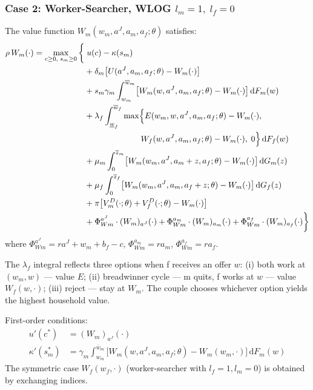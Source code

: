 \documentclass[11pt]{article}
\newcommand{\aJ}{a^{J}}
\newcommand{\dF}{\,\mathrm{d}F}
\newcommand{\dG}{\,\mathrm{d}G}
\begin{document}
\subsubsection{Case 2: Worker-Searcher, WLOG $l_m = 1,\; l_f = 0$}

The value function $W_m(w_m, \aJ, a_m, a_f;\theta)$ satisfies:
\begin{align}
    \rho\, W_m(\cdot) = \max_{c \geq 0,\; s_m \geq 0} \bigg\{
    &\; u(c) - \kappa(s_m) \notag\\
    &+ \delta_m \bigl[U(\aJ, a_m, a_f;\theta) - W_m(\cdot)\bigr] \notag\\
    &+ s_m \gamma_m \int_{w_m}^{\overline{w}_m} \bigl[W_m(w, \aJ, a_m, a_f;\theta) - W_m(\cdot)\bigr] \dF_m(w) \notag\\
    &+ \lambda_f \int_{\underline{w}_f}^{\overline{w}_f} \max\Bigl\{
        E(w_m, w, \aJ, a_m, a_f;\theta) - W_m(\cdot), \notag\\
    &\qquad\qquad\qquad\;\;\; W_f(w, \aJ, a_m, a_f;\theta) - W_m(\cdot),\; 0
    \Bigr\} \dF_f(w) \notag\\
    &+ \mu_m \int_0^{\overline{z}_m} \bigl[W_m(w_m, \aJ, a_m + z, a_f;\theta) - W_m(\cdot)\bigr] \dG_m(z) \notag\\
    &+ \mu_f \int_0^{\overline{z}_f} \bigl[W_m(w_m, \aJ, a_m, a_f + z;\theta) - W_m(\cdot)\bigr] \dG_f(z) \notag\\
    &+ \pi \bigl[V_m^D(\cdot;\theta) + V_f^D(\cdot;\theta) - W_m(\cdot)\bigr] \notag\\
    &+ \Phi^{\aJ}_{Wm} \cdot (W_m)_{\aJ}(\cdot)
     + \Phi^{a_m}_{Wm} \cdot (W_m)_{a_m}(\cdot)
     + \Phi^{a_f}_{Wm} \cdot (W_m)_{a_f}(\cdot)
    \bigg\}
    \label{eq:HJB_Wm}
\end{align}
where $\Phi^{\aJ}_{Wm} = r\aJ + w_m + b_f - c$, $\Phi^{a_m}_{Wm} = r a_m$, $\Phi^{a_f}_{Wm} = r a_f$.

The $\lambda_f$ integral reflects three options when f receives an offer $w$: (i) both work at $(w_m, w)$ --- value $E$; (ii) breadwinner cycle --- m quits, f works at $w$ --- value $W_f(w, \cdot)$; (iii) reject --- stay at $W_m$. The couple chooses whichever option yields the highest household value.

First-order conditions:
\begin{align}
    u'(c^*) &= (W_m)_{\aJ}(\cdot) \label{eq:FOC_Wm_c} \\
    \kappa'(s_m^*) &= \gamma_m \int_{w_m}^{\overline{w}_m} \bigl[W_m(w, \aJ, a_m, a_f;\theta) - W_m(w_m, \cdot)\bigr] \dF_m(w) \label{eq:FOC_Wm_s}
\end{align}
The symmetric case $W_f(w_f, \cdot)$ (worker-searcher with $l_f=1, l_m=0$) is obtained by exchanging indices.
\end{document}
